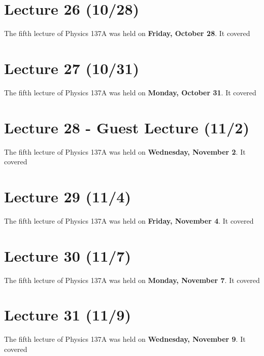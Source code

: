 \documentclass{book}
\theoremstyle{plain}
\begin{document}
      \chapter{Lecture 26 (10/28)}
        The fifth lecture of Physics 137A was held on \textbf{Friday, October 28}. It covered
        
      \chapter{Lecture 27 (10/31)}
        The fifth lecture of Physics 137A was held on \textbf{Monday, October 31}. It covered
        
      \chapter{Lecture 28 - Guest Lecture (11/2)}
        The fifth lecture of Physics 137A was held on \textbf{Wednesday, November 2}. It covered
        
      \chapter{Lecture 29 (11/4)}
        The fifth lecture of Physics 137A was held on \textbf{Friday, November 4}. It covered
        
      \chapter{Lecture 30 (11/7)}
        The fifth lecture of Physics 137A was held on \textbf{Monday, November 7}. It covered
        
      \chapter{Lecture 31 (11/9)}
        The fifth lecture of Physics 137A was held on \textbf{Wednesday, November 9}. It covered
        
\end{document}
